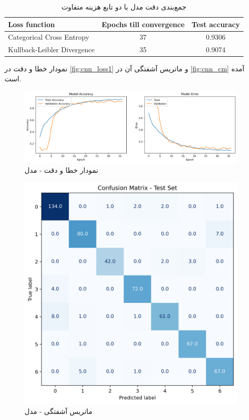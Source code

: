 \documentclass[11pt]{article}
\begin{document}
	\begin{table}[h!]
		\caption{جمع‌بندی دقت مدل‌  با دو تابع هزینه متفاوت}
		\begin{latin}
			\centering
			\begin{tabular}{|l|c|c|}
				\hline
				\textbf{Loss function} &  \textbf{Epochs till convergence} & \textbf{Test accuracy} \\ \hline
				Categorical Cross Entropy &  37 & 0.9306 \\  \hline
				Kullback-Leibler Divergence &  35 & 0.9074\\ \hline
			\end{tabular}
		\end{latin}
		\label{tab:accuracy_cnnlstm} 
 	\end{table}
	نمودار خطا و دقت در
	\autoref{fig:cnn_loss1}
	و ماتریس آشفتگی آن در 
	\autoref{fig:cnn_cm}
	آمده است.
	\begin{figure}[!h]
		\centerline{\includegraphics[width=1\linewidth]{../EMO_cnnlstm_loss1.png}}
		\caption{نمودار خطا و دقت  -  مدل }
		\label{fig:cnnlstm_loss1}
	\end{figure}
	\begin{figure}[!h]
		\centerline{\includegraphics[width=0.7\linewidth]{../cnnlstm_loss1_cm.png}}
		\caption{ماتریس آشفتگی - مدل }
		\label{fig:cnnlstm_cm} 
	\end{figure}\\
	\clearpage
\end{document}
